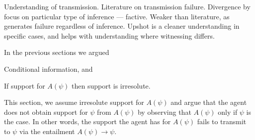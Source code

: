 \documentclass[10pt]{article}
\begin{document}
\newpage

\begin{note}[Outline]
  Understanding of transmission.
  Literature on transmission failure.
  Divergence by focus on particular type of inference --- factive.
  Weaker than literature, as generates failure regardless of inference.
  Upshot is a cleaner understanding in specific cases, and helps with understanding where witnessing differs.

  In the previous sections we argued
  \begin{enumerate*}
  \item Conditional information, and
  \item If support for \(A(\psi)\) then support is irresolute.
  \end{enumerate*}
  This section, we assume irresolute support for \(A(\psi)\) and argue that the agent does not obtain support for \(\psi\) from \(A(\psi)\) by observing that \(A(\psi)\) only if \(\psi\) is the case.
  In other words, the support the agent has for \(A(\psi)\) fails to transmit to \(\psi\) via the entailment \(A(\psi) \rightarrow \psi\).
\end{note}
\end{document}
